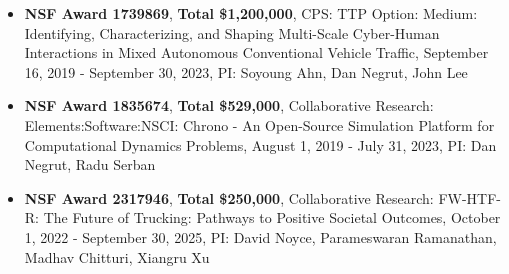 



\begin{footnotesize}

\begin{itemize}[leftmargin=2ex, nosep, noitemsep]
	
	\item {\textbf{NSF Award 1739869}, \textbf{Total \$1,200,000}, CPS: TTP Option: Medium: Identifying, Characterizing, and Shaping Multi-Scale Cyber-Human Interactions in Mixed Autonomous Conventional Vehicle Traffic, September 16, 2019 - September 30, 2023, PI: Soyoung Ahn, Dan Negrut, John Lee}

	\item {\textbf{NSF Award 1835674}, \textbf{Total \$529,000}, Collaborative Research: Elements:Software:NSCI: Chrono - An Open-Source Simulation Platform for Computational Dynamics Problems, August 1, 2019 - July 31, 2023, PI: Dan Negrut, Radu Serban}
	
	\item {\textbf{NSF Award 2317946}, \textbf{Total \$250,000}, 	Collaborative Research: FW-HTF-R: The Future of Trucking: Pathways to Positive Societal Outcomes, October 1, 2022 - September 30, 2025, PI: David Noyce, Parameswaran Ramanathan, Madhav Chitturi, Xiangru Xu}

	

\end{itemize}
	
\end{footnotesize}


